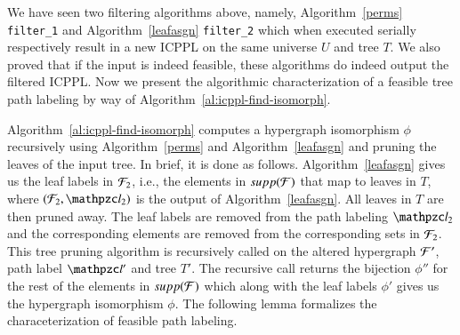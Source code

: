 \documentclass[MS,synopsis]{iitmdiss}
\begin{document}
We have seen two filtering algorithms above, namely,
Algorithm~\ref{perms} {\tt filter\_1} and Algorithm~\ref{leafasgn}
{\tt filter\_2} which when executed serially respectively result in a
new ICPPL on the same universe $U$ and tree $T$. We also proved that
if the input is indeed feasible, these algorithms do indeed output the
filtered ICPPL. Now we present the algorithmic characterization of a
feasible tree path labeling by way of Algorithm~\ref{al:icppl-find-isomorph}.

Algorithm~\ref{al:icppl-find-isomorph} computes a
hypergraph isomorphism $\phi$ recursively using Algorithm~\ref{perms}
and Algorithm~\ref{leafasgn} and pruning the leaves of the input
tree. In brief, it is done as follows. Algorithm~\ref{leafasgn} gives
us the leaf labels in ${\cal F}_2$, i.e., the elements in $supp({\cal F})$ that
map to leaves in $T$, where $(\cF_2, \cl_2)$ is the output of
Algorithm~\ref{leafasgn}. All leaves in $T$ are then pruned away. The
leaf labels are removed from the path labeling $\cl_2$ and the
corresponding elements are removed from the corresponding sets in
${\cal F}_2$. This tree pruning algorithm is recursively called on the
altered hypergraph ${\cal F}'$, path label $\cl'$ and tree $T'$. The
recursive call returns the bijection $\phi''$ for the rest of the
elements in $supp({\cal F})$ which along with the leaf labels $\phi'$ gives
us the hypergraph isomorphism $\phi$.  The following lemma formalizes
the characeterization of feasible path labeling.




\end{document}
